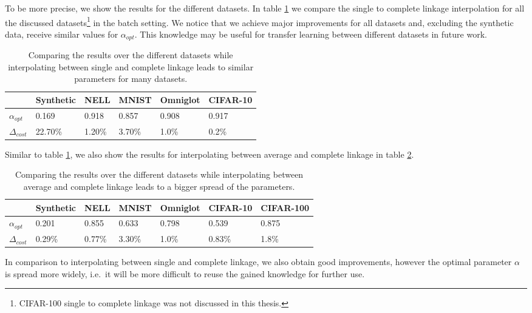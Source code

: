 To be more precise, we show the results for the different datasets. In table \ref{table:comparison} we compare the single to complete linkage interpolation for all the discussed datasets\footnote{CIFAR-100 single to complete linkage was not discussed in this thesis.} in the batch setting. We notice that we achieve major improvements for all datasets and, excluding the synthetic data, receive similar values for $\alpha_{opt}$. This knowledge may be useful for transfer learning between different datasets in future work.

\begin{table}[H]
    \centering
    \begin{tabular}{|l | l | l | l | l | l |}
    \hline
    & Synthetic & NELL & MNIST & Omniglot & CIFAR-10\\ \hline
    $\alpha_{opt}$ & 0.169 & 0.918 & 0.857 & 0.908 & 0.917\\
    $\Delta_{cost}$ & 22.70\% & 1.20\% & 3.70\% & 1.0\% & 0.2\%\\\hline
    \end{tabular}
    \caption{Comparing the results over the different datasets while interpolating between single and complete linkage leads to similar parameters for many datasets.}
    \label{table:comparison}
\end{table}

Similar to table \ref{table:comparison}, we also show the results for interpolating between average and complete linkage in table \ref{table:comparison_ac}.

\begin{table}[H]
    \centering
    \begin{tabular}{|l | l | l | l | l | l | l |}
    \hline
    & Synthetic & NELL & MNIST & Omniglot & CIFAR-10 & CIFAR-100\\ \hline
    $\alpha_{opt}$ & 0.201 & 0.855 & 0.633 & 0.798 & 0.539 & 0.875\\
    $\Delta_{cost}$ & 0.29\% & 0.77\% & 3.30\% & 1.0\% & 0.83\% & 1.8\%\\\hline
    \end{tabular}
    \caption{Comparing the results over the different datasets while interpolating between average and complete linkage leads to a bigger spread of the parameters.}
    \label{table:comparison_ac}
\end{table}

In comparison to interpolating between single and complete linkage, we also obtain good improvements, however the optimal parameter $\alpha$ is spread more widely, i.e.\ it will be more difficult to reuse the gained knowledge for further use.\\

